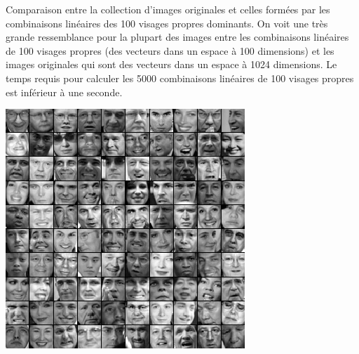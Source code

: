 \begin{adjmulticols}{1}{0in}{-2in}
\begin{center}
\begin{minipage}{0.45\textwidth}
\end{minipage}
\end{center}

\begin{center}
\begin{minipage}{0.4\textwidth}
Comparaison entre la collection d'images originales
et celles formées par les combinaisons linéaires des
100 visages propres dominants.  On voit une très grande
ressemblance pour la plupart des images entre les 
combinaisons linéaires de 100 visages propres (des
vecteurs dans un espace à 100 dimensions) et les images originales qui sont des vecteurs dans
un espace à 1024 dimensions. Le temps requis pour calculer les 5000 combinaisons
linéaires de 100 visages propres est inférieur à une seconde.
\end{minipage}
\hfill
\begin{minipage}{0.45\textwidth}
\includegraphics[width=\linewidth]{./images/faces}
\end{minipage}
\hfill
\begin{minipage}{0.45\textwidth}

\end{minipage}
\end{center}
\end{adjmulticols}
